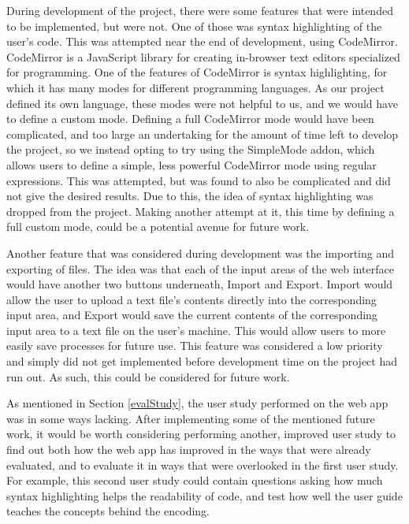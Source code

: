 \documentclass{l4proj}
\begin{document}
\quad During development of the project, there were some features that were intended to be implemented, but were not. One of those was syntax highlighting of the user's code. This was attempted near the end of development, using CodeMirror. \citep{CodeMirror} CodeMirror is a JavaScript library for creating in-browser text editors specialized for programming. One of the features of CodeMirror is syntax highlighting, for which it has many modes for different programming languages. As our project defined its own language, these modes were not helpful to us, and we would have to define a custom mode. Defining a full CodeMirror mode would have been complicated, and too large an undertaking for the amount of time left to develop the project, so we instead opting to try using the SimpleMode addon, which allows users to define a simple, less powerful CodeMirror mode using regular expressions. This was attempted, but was found to also be complicated and did not give the desired results. Due to this, the idea of syntax highlighting was dropped from the project. Making another attempt at it, this time by defining a full custom mode, could be a potential avenue for future work.

\quad Another feature that was considered during development was the importing and exporting of files. The idea was that each of the input areas of the web interface would have another two buttons underneath, Import and Export. Import would allow the user to upload a text file's contents directly into the corresponding input area, and Export would save the current contents of the corresponding input area to a text file on the user's machine. This would allow users to more easily save processes for future use. This feature was considered a low priority and simply did not get implemented before development time on the project had run out. As such, this could be considered for future work.

\quad As mentioned in Section \ref{evalStudy}, the user study performed on the web app was in some ways lacking. After implementing some of the mentioned future work, it would be worth considering performing another, improved user study to find out both how the web app has improved in the ways that were already evaluated, and to evaluate it in ways that were overlooked in the first user study. For example, this second user study could contain questions asking how much syntax highlighting helps the readability of code, and test how well the user guide teaches the concepts behind the encoding.
\end{document}

